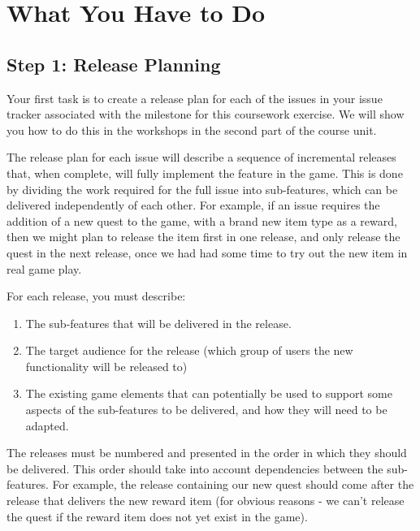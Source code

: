 \documentclass[
]{book}
\providecommand{\tightlist}{%
  \setlength{\itemsep}{0pt}\setlength{\parskip}{0pt}}
\begin{document}
\hypertarget{udo}{%
\section{What You Have to Do}\label{udo}}

\hypertarget{releaseplan}{%
\subsection{Step 1: Release Planning}\label{releaseplan}}

Your first task is to create a release plan for each of the issues in your issue tracker associated with the milestone for this coursework exercise. We will show you how to do this in the workshops in the second part of the course unit.

The release plan for each issue will describe a sequence of incremental releases that, when complete, will fully implement the feature in the game. This is done by dividing the work required for the full issue into sub-features, which can be delivered independently of each other. For example, if an issue requires the addition of a new quest to the game, with a brand new item type as a reward, then we might plan to release the item first in one release, and only release the quest in the next release, once we had had some time to try out the new item in real game play.

For each release, you must describe:

\begin{enumerate}
\def\labelenumi{\arabic{enumi}.}
\tightlist
\item
  The sub-features that will be delivered in the release.
\item
  The target audience for the release (which group of users the new functionality will be released to)
\item
  The existing game elements that can potentially be used to support some aspects of the sub-features to be delivered, and how they will need to be adapted.
\end{enumerate}

The releases must be numbered and presented in the order in which they should be delivered. This order should take into account dependencies between the sub-features. For example, the release containing our new quest should come after the release that delivers the new reward item (for obvious reasons - we can't release the quest if the reward item does not yet exist in the game).
\end{document}
